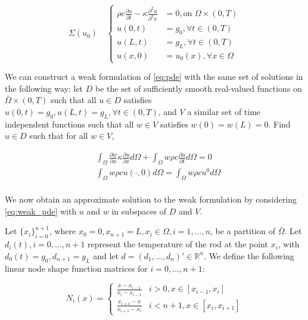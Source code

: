 \documentclass[oribibl]{llncs/llncs}
\newcommand*{\R}{\mathbb{R}}
\begin{document}
\begin{equation}\label{eq:pde}
    \Sigma(u_0) \quad \left \{
    \begin{aligned}
        \rho c \frac{\partial u}{\partial t} - \kappa \frac{\partial^2
        u}{\partial^2 x} &= 0, \text{on } \Omega \times (0, T) \\
        u(0, t) &= g_0, \forall t \in (0, T) \\
        u(L, t) &= g_L, \forall t \in (0, T) \\
        u(x, 0) &= u_0(x), \forall x \in \Omega
    \end{aligned}
    \right.
\end{equation}

We can construct a weak formulation of \cref{eq:pde} with the same set of
solutions in the following way: let $D$ be the set of sufficiently smooth 
real-valued functions on $\bar{\Omega} \times (0, T)$ such that all 
$u \in D$ satisfies $u(0, t) = g_0, u(L, t) = g_L, \forall t \in (0, T)$, 
and $V$ a similar set of time
independent functions such that all $w \in V$ satisfies $w(0) = w(L) = 0$. 
Find $u \in D$ such that for all $w \in V$,

\begin{equation}\label{eq:weak_pde}
    \begin{aligned}
        &\int_{\Omega} \frac{\partial w}{\partial x} \kappa \frac{\partial
        u}{\partial x} d \Omega + 
        \int_{\Omega} w \rho c \frac{\partial u}{\partial t} d \Omega = 0 \\
        &\int_{\Omega} w \rho c u(\cdot, 0) d \Omega =
        \int_{\Omega} w \rho c u^0 d \Omega \\
    \end{aligned}
\end{equation}

We now obtain an approximate solution to the weak formulation by considering
\cref{eq:weak_pde} with $u$ and $w$ in subspaces of $D$ and $V$.

Let $\{x_i\}_{i = 0}^{n +
1}$, where $x_0 = 0, x_{n+1} = L, x_i \in \Omega, i = 1,...,n$, be a partition of
$\bar\Omega$. Let $d_i(t), i = 0,...,n+1$ represent the
temperature of the rod at the point $x_i$, with $d_0(t) = g_0, d_{n+1} = g_L$ and let $d = (d_1, ..., d_n)' \in
\R^n$. We define the following linear node shape function matrices for $i =
0,...,n+1$:

\begin{equation}
    N_i(x) = \begin{cases}
        \frac{x - x_{i - 1}}{x_i - x_{i - 1}} & i > 0, x \in [x_{i-1}, x_i] \\
        \frac{x_{i+1} - x}{x_{i+1} - x_{i}} & i < n+1, x \in [x_{i}, x_{i+1}] 
    \end{cases} 
\end{equation}
\end{document}
